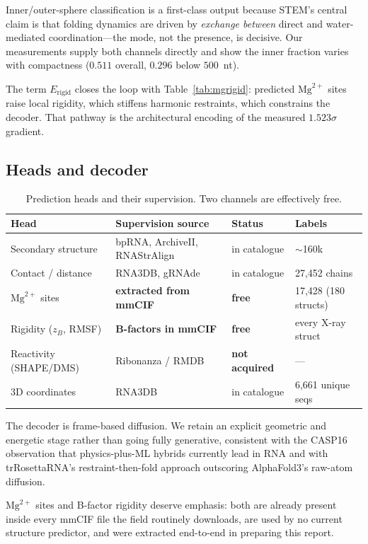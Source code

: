 \documentclass[11pt,a4paper]{article}
\begin{document}
Inner/outer-sphere classification is a first-class output because STEM's central
claim is that folding dynamics are driven by \emph{exchange between} direct and
water-mediated coordination---the mode, not the presence, is decisive. Our
measurements supply both channels directly and show the inner fraction varies
with compactness ($0.511$ overall, $0.296$ below $500$~nt).

The term $E_{\text{rigid}}$ closes the loop with Table~\ref{tab:mgrigid}:
predicted $\mathrm{Mg}^{2+}$ sites raise local rigidity, which stiffens harmonic
restraints, which constrains the decoder. That pathway is the architectural
encoding of the measured $1.523\sigma$ gradient.

\subsection{Heads and decoder}

\begin{table}[h]
\centering
\caption{Prediction heads and their supervision. Two channels are effectively free.}
\label{tab:heads}
\small
\begin{tabular}{@{}llll@{}}
\toprule
\textbf{Head} & \textbf{Supervision source} & \textbf{Status} & \textbf{Labels} \\
\midrule
Secondary structure & bpRNA, ArchiveII, RNAStrAlign & in catalogue & $\sim$160k \\
Contact / distance  & RNA3DB, gRNAde & in catalogue & 27{,}452 chains \\
$\mathrm{Mg}^{2+}$ sites & \textbf{extracted from mmCIF} & \textbf{free} & 17{,}428 (180 structs) \\
Rigidity ($z_B$, RMSF) & \textbf{B-factors in mmCIF} & \textbf{free} & every X-ray struct \\
Reactivity (SHAPE/DMS) & Ribonanza / RMDB & \textbf{not acquired} & --- \\
3D coordinates & RNA3DB & in catalogue & 6{,}661 unique seqs \\
\bottomrule
\end{tabular}
\end{table}

The decoder is frame-based diffusion. We retain an explicit geometric and
energetic stage rather than going fully generative, consistent with the CASP16
observation that physics-plus-ML hybrids currently lead in RNA and with
trRosettaRNA's restraint-then-fold approach outscoring AlphaFold3's raw-atom
diffusion.

$\mathrm{Mg}^{2+}$ sites and B-factor rigidity deserve emphasis: both are
already present inside every mmCIF file the field routinely downloads, are used
by no current structure predictor, and were extracted end-to-end in preparing
this report.
\end{document}
